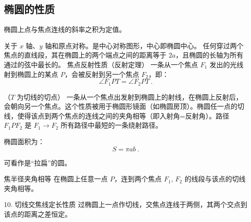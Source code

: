 \subsection{椭圆的性质}

椭圆上点与焦点连线的斜率之积为定值。

关于 $x$ 轴、$y$ 轴和原点对称。是中心对称图形，中心即椭圆中心。
任何穿过两个焦点的直线段，其在椭圆上的两个端点之间的距离等于 $2a$，且椭圆的长轴为所有通过的弦中最长的。
焦点反射性质（反射定理）
一条从一个焦点 $F_1$ 发出的光线射到椭圆上的某点 $P$，会被反射到另一个焦点 $F_2$，即：
\begin{equation}
\angle F_1PT = \angle F_2PT~.
\end{equation}

（$T$ 为切线的切点）
一条从一个焦点出发射到椭圆上的射线，在椭圆上反射后，会朝向另一个焦点。这个性质被用于椭圆形镜面（如椭圆房顶）。椭圆任一点的切线，使得该点到两个焦点的连线之间的夹角相等（即入射角=反射角）。路径 $F_1PF_2$ 是 $F_1 \to F_2$ 所有路径中最短的一条绕射路径。

椭圆面积为：
\begin{equation}
S = \pi a b~.
\end{equation}

可看作是“拉扁”的圆。

焦半径夹角相等
在椭圆上任意一点 $P$，连到两个焦点 $F_1$, $F_2$ 的线段与该点的切线夹角相等。

	10.	切线交焦线定长性质
过椭圆上一点作切线，交焦点连线于两侧，其两个交点到该点的距离之差恒定。







